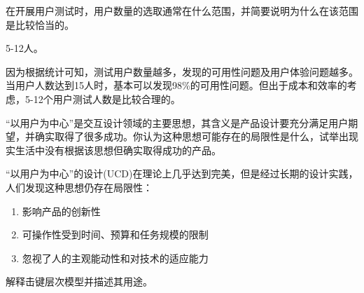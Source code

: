 \begin{problem}[2013]
在开展用户测试时，用户数量的选取通常在什么范围，并简要说明为什么在该范围是比较恰当的。
\end{problem}

\begin{solution}
5-12人。

因为根据统计可知，测试用户数量越多，发现的可用性问题及用户体验问题越多。当用户人数达到15人时，基本可以发现98\%的可用性问题。但出于成本和效率的考虑，5-12个用户测试人数是比较合理的。
\end{solution}



\begin{problem}[2013]
“以用户为中心”是交互设计领域的主要思想，其含义是产品设计要充分满足用户期望，并确实取得了很多成功。你认为这种思想可能存在的局限性是什么，试举出现实生活中没有根据该思想但确实取得成功的产品。
\end{problem}

\begin{solution}
“以用户为中心”的设计(UCD)在理论上几乎达到完美，但是经过长期的设计实践，人们发现这种思想仍存在局限性：
\vspace{-0.8em}
\begin{multicols}{2}
    \begin{enumerate}[label=\arabic*.]
        \item 影响产品的创新性
        \item 可操作性受到时间、预算和任务规模的限制
        \item 忽视了人的主观能动性和对技术的适应能力
    \end{enumerate}
\end{multicols}
\vspace{-1em}
\end{solution}



\begin{problem}[2013]
解释击键层次模型并描述其用途。
\end{problem}

